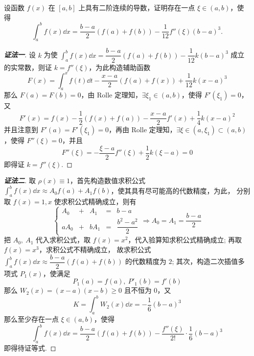 \begin{example}
    设函数 $f(x)$ 在 $[a,b]$ 上具有二阶连续的导数，证明存在一点 $\xi\in(a,b)$，使得
    $$\int_{a}^{b}f(x)\dd x=\dfrac{b-a}{2}(f(a)+f(b))-\dfrac{1}{12}f''(\xi)(b-a)^3.$$
\end{example}
\begin{proof}[{\songti \textbf{证法一}}]
    设 $k$ 为使 $\displaystyle \int_{a}^{b}f(x)\dd x=\dfrac{b-a}{2}(f(a)+f(b))-\dfrac{1}{12}k(b-a)^3$ 成立的实常数，则证 $k=f''(\xi)$，为此构造辅助函数
    $$F(x)=\int_{a}^{x}f(t)\dd t-\dfrac{x-a}{2}(f(a)+f(x))+\dfrac{1}{12}k(x-a)^3$$
    那么 $F(a)=F(b)=0$，由 Rolle 定理知，$\exists\xi_1\in(a,b)$，使得 $F'(\xi_1)=0$，又
    $$F'(x)=f(x)-\dfrac{1}{2}(f(x)+f(a))-\dfrac{x-a}{2}f'(x)+\dfrac{1}{4}k(x-a)^2$$
    并且注意到 $F'(a)=F'(\xi_1)=0$，再由 Rolle 定理知，$\exists\xi\in(a,\xi_1)\subset(a,b)$，使得 $F''(\xi)=0$，并且
    $$F''(\xi)=-\dfrac{\xi-a}{2}f''(\xi)+\dfrac{1}{2}k(\xi-a)=0$$
    即得证 $k=f''(\xi).$
\end{proof}
\begin{proof}[{\songti \textbf{证法二}}]
    取 $\rho(x)\equiv1$，首先构造数值求积公式 $\displaystyle\int_{a}^{b}f(x)\dd x\approx A_0f(a)+A_1f(b)$，使其具有尽可能高的代数精度，为此，
    分别取 $f(x)=1,x$ 使求积公式精确成立，则有 $$\left\{\begin{matrix}
            A_0  & + & A_1  & = & b-a                \\
            aA_0 & + & bA_1 & = & \dfrac{b^2-a^2}{2}
        \end{matrix}\right.\Rightarrow A_0=A_1=\dfrac{b-a}{2} $$
    把 $A_0,~A_1$ 代入求积公式，取 $f(x)=x^2$，代入验算知求积公式精确成立; 再取 $f(x)=x^3$，求积公式不精确成立，
    故求积公式 $\displaystyle\int_{a}^{b}f(x)\dd x\approx\dfrac{b-a}{2}(f(a)+f(b))$ 的代数精度为 $2$;
    其次，构造二次插值多项式 $P_1(x)$，使满足 $$P_1(a)=f(a),~P'_1(b)=f'(b)$$
    那么 $W_2(x)=(x-a)(x-b)\geqslant 0$ 且不恒为 $0$，又
    $$K=\int_{a}^{b}W_2(x)\dd x=-\dfrac{1}{6}(b-a)^3$$
    那么至少存在一点 $\xi\in(a,b)$，使得
    $$\int_{a}^{b}f(x)\dd x=\dfrac{b-a}{2}(f(a)+f(b))-\dfrac{f''(\xi)}{2!}\cdot\dfrac{1}{6}(b-a)^3$$
    即得待证等式.
\end{proof}

